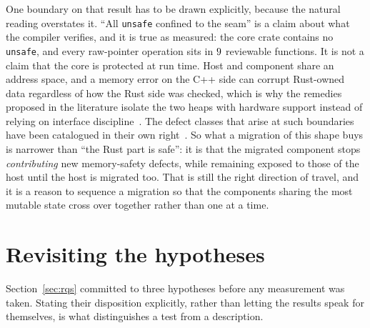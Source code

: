 \documentclass[english,twoside,openright,a4paper,censored,csm,software-track-2020]{HYthesisML}
\begin{document}
One boundary on that result has to be drawn explicitly, because the natural reading overstates
it. ``All \texttt{unsafe} confined to the seam'' is a claim about what the compiler verifies,
and it is true as measured: the core crate contains no \texttt{unsafe}, and every raw-pointer
operation sits in $9$ reviewable functions. It is not a claim that the core is protected at run
time. Host and component share an address space, and a memory error on the C++ side can corrupt
Rust-owned data regardless of how the Rust side was checked, which is why the remedies proposed
in the literature isolate the two heaps with hardware support instead of relying on interface
discipline~\cite{rivera2021galeed,kirth2022pkrusafe}. The defect classes that arise at such
boundaries have been catalogued in their own right~\cite{li2022crosslang}. So what a migration
of this shape buys is narrower than ``the Rust part is safe'': it is that the migrated
component stops \emph{contributing} new memory-safety defects, while remaining exposed to those
of the host until the host is migrated too. That is still the right direction of travel, and it
is a reason to sequence a migration so that the components sharing the most mutable state cross
over together rather than one at a time.

\section{Revisiting the hypotheses}\label{sec:hypotheses}
Section~\ref{sec:rqs} committed to three hypotheses before any measurement was
taken. Stating their disposition explicitly, rather than letting the results speak for
themselves, is what distinguishes a test from a description.
\end{document}
